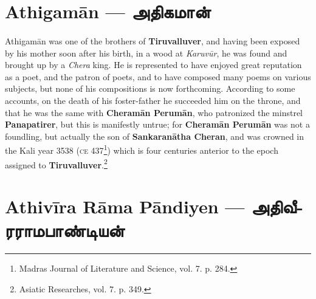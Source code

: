 \documentclass{article}
\newcommand{\TamilBold}[1]{\texttamil{\textbf{#1}}}
\newcommand{\tambold}[1]{\TamilBold{#1}}
\begin{document}
\section{Athigam\={a}n --- \tambold{அதிகமான்}}
\paragraph{}
Athigam\={a}n was one of the brothers of \textbf{Tiruvalluver}, and having been exposed by his mother soon after his birth, in a wood at \emph{Karuv\={u}r}, he was found and brought up by a \emph{Chera} king. He is represented to have enjoyed great reputation as a poet, and the patron of poets, and to have composed many poems on various subjects, but none of his compositions is now forthcoming. According to some accounts, on the death of his foster-father he succeeded him on the throne, and that he was the same with \textbf{Cheram\={a}n Perum\={a}n}, who patronized the minstrel \textbf{Panapatirer}, but this is manifestly untrue; for \textbf{Cheram\={a}n Perum\={a}n} was not a foundling, but actually the son of \textbf{Sankaran\={a}tha Cheran}, and was crowned in the Kali year 3538 (\textsc{ce} 437\footnote{Madras Journal of Literature and Science, vol. 7. p. 284.}) which is four centuries anterior to the epoch assigned to \textbf{Tiruvalluver}.\footnote{Asiatic Researches, vol. 7. p. 349.}

\section{Athiv\={i}ra R\={a}ma P\={a}ndiyen --- \tambold{அதிவீரராமபாண்டியன்}}
\end{document}
